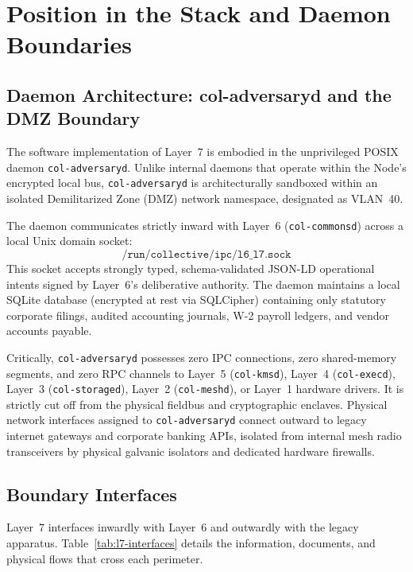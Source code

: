 \section{Position in the Stack and Daemon Boundaries}

\subsection{Daemon Architecture: col-adversaryd and the DMZ Boundary}

The software implementation of Layer~7 is embodied in the unprivileged POSIX daemon \texttt{col-adversaryd}. Unlike internal daemons that operate within the Node's encrypted local bus, \texttt{col-adversaryd} is architecturally sandboxed within an isolated Demilitarized Zone (DMZ) network namespace, designated as VLAN~40.

The daemon communicates strictly inward with Layer~6 (\texttt{col-commonsd}) across a local Unix domain socket:
\begin{equation}
  \texttt{/run/collective/ipc/l6\_l7.sock}
\end{equation}
This socket accepts strongly typed, schema-validated JSON-LD operational intents signed by Layer~6's deliberative authority. The daemon maintains a local SQLite database (encrypted at rest via SQLCipher) containing only statutory corporate filings, audited accounting journals, W-2 payroll ledgers, and vendor accounts payable. 

Critically, \texttt{col-adversaryd} possesses zero IPC connections, zero shared-memory segments, and zero RPC channels to Layer~5 (\texttt{col-kmsd}), Layer~4 (\texttt{col-execd}), Layer~3 (\texttt{col-storaged}), Layer~2 (\texttt{col-meshd}), or Layer~1 hardware drivers. It is strictly cut off from the physical fieldbus and cryptographic enclaves. Physical network interfaces assigned to \texttt{col-adversaryd} connect outward to legacy internet gateways and corporate banking APIs, isolated from internal mesh radio transceivers by physical galvanic isolators and dedicated hardware firewalls.

\subsection{Boundary Interfaces}

Layer~7 interfaces inwardly with Layer~6 and outwardly with the legacy apparatus. Table~\ref{tab:l7-interfaces} details the information, documents, and physical flows that cross each perimeter.

